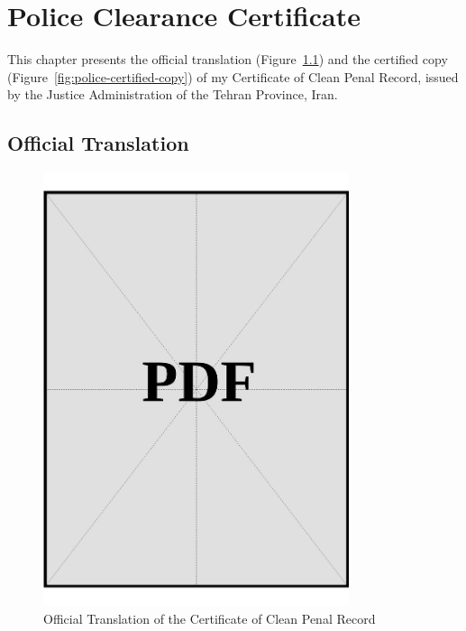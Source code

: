 
\chapter{Police Clearance Certificate}\label{sec:police-clearance-certificate}

\noindent This chapter presents the official translation (Figure~\ref{fig:police-official-translation}) and the certified copy (Figure~\ref{fig:police-certified-copy}) of my Certificate of Clean Penal Record, issued by the Justice Administration of the Tehran Province, Iran. 

\clearpage

\section*{Official Translation}
\vspace*{\fill}

\begin{figure}[h]
    \centering
    \includegraphics[page=1, width=0.8\textwidth]{../docs/applicant/police-clearance-certificate/official-translations.pdf}
    \caption{Official Translation of the Certificate of Clean Penal Record}
    \label{fig:police-official-translation}
\end{figure}
\vspace*{\fill}

